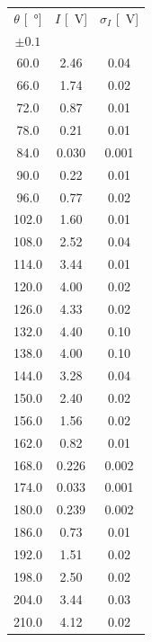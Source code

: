 \documentclass[10pt,oneside,a4paper]{article}
\begin{document}
\begin{minipage}[t]{.5\linewidth}
\begin{center}
\label{tab:taratura_lambda2}
\begin{tabular}{c|c|c}
\toprule
     $\theta$ [\SI{}{\degree}] &    $I$ [\SI{}{V}] &   $\sigma_I$ [\SI{}{V}]\\
     $\pm 0.1$ & & \\
\midrule
  60.0 &  2.46 &  0.04 \\
  66.0 &  1.74 &  0.02 \\
  72.0 &  0.87 &  0.01 \\
  78.0 &  0.21 &  0.01 \\
  84.0 &  0.030 &  0.001 \\
  90.0 &  0.22 &  0.01 \\
  96.0 &  0.77 &  0.02 \\
 102.0 &  1.60 &  0.01 \\
 108.0 &  2.52 &  0.04 \\
 114.0 &  3.44 &  0.01 \\
 120.0 &  4.00 &  0.02 \\
 126.0 &  4.33 &  0.02 \\
 132.0 &  4.40 &  0.10 \\
 138.0 &  4.00 &  0.10 \\
 144.0 &  3.28 &  0.04 \\
 150.0 &  2.40 &  0.02 \\
 156.0 &  1.56 &  0.02 \\
 162.0 &  0.82 &  0.01 \\
 168.0 &  0.226 &  0.002 \\
 174.0 &  0.033 &  0.001 \\
 180.0 &  0.239 &  0.002 \\
 186.0 &  0.73 &  0.01 \\
 192.0 &  1.51 &  0.02 \\
 198.0 &  2.50 &  0.02 \\
 204.0 &  3.44 &  0.03 \\
 210.0 &  4.12 &  0.02 \\
\bottomrule
\end{tabular}
\end{center}
\end{minipage}
\hspace{1em}
\end{document}
